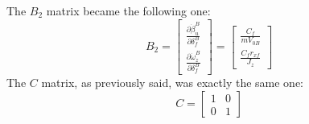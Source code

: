 The $B_{2}$ matrix became the following one:
\begin{equation}
B_{2}=
\begin{bmatrix}
\frac{\partial\dot{\beta}_{u}^{B}}{\partial\delta_{f}^{B}} \\
\frac{\partial\dot{\omega}_{z}^{B}}{\partial\delta_{f}^{B}} 
\end{bmatrix} =
\begin{bmatrix}
\frac{C_{f}}{m V_{0B}} \\ \frac{C_{f}r_{xf}}{J_{z}}
\end{bmatrix} 
\end{equation}
The $C$ matrix, as previously said, was exactly the same one:
\begin{equation}
C = 
\begin{bmatrix}
1 & 0 \\
0 & 1
\end{bmatrix}
\end{equation}
